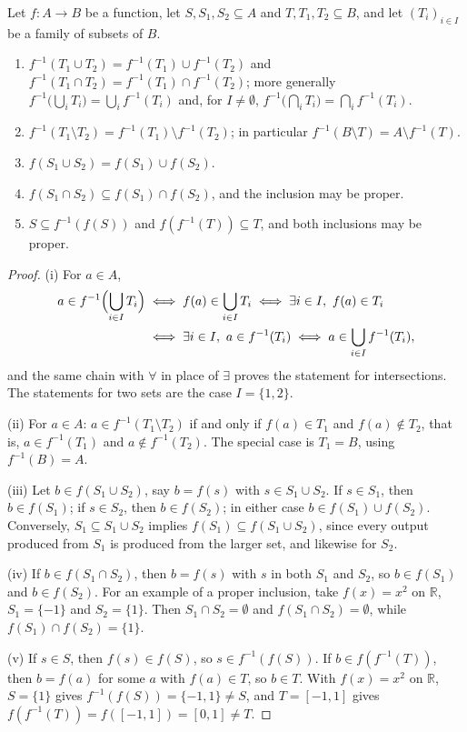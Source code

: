 \begin{proposition}
\label{prop:image-preimage}
Let $f\colon A\to B$ be a function, let $S,S_1,S_2\subseteq A$ and $T,T_1,T_2\subseteq B$, and let $(T_i)_{i\in I}$ be a family of subsets of $B$.
\begin{enumerate}
\item $f^{-1}(T_1\cup T_2)=f^{-1}(T_1)\cup f^{-1}(T_2)$ and $f^{-1}(T_1\cap T_2)=f^{-1}(T_1)\cap f^{-1}(T_2)$; more generally $f^{-1}\bigl(\bigcup_iT_i\bigr)=\bigcup_if^{-1}(T_i)$ and, for $I\ne\emptyset$, $f^{-1}\bigl(\bigcap_iT_i\bigr)=\bigcap_if^{-1}(T_i)$.
\item $f^{-1}(T_1\setminus T_2)=f^{-1}(T_1)\setminus f^{-1}(T_2)$; in particular $f^{-1}(B\setminus T)=A\setminus f^{-1}(T)$.
\item $f(S_1\cup S_2)=f(S_1)\cup f(S_2)$.
\item $f(S_1\cap S_2)\subseteq f(S_1)\cap f(S_2)$, and the inclusion may be proper.
\item $S\subseteq f^{-1}(f(S))$ and $f(f^{-1}(T))\subseteq T$, and both inclusions may be proper.
\end{enumerate}
\end{proposition}

\begin{proof}
(i) For $a\in A$,
\begin{align*}
a\in f^{-1}\Bigl(\bigcup_{i\in I}T_i\Bigr)&\iff f(a)\in\bigcup_{i\in I}T_i\iff\exists i\in I,\ f(a)\in T_i\\
&\iff\exists i\in I,\ a\in f^{-1}(T_i)\iff a\in\bigcup_{i\in I}f^{-1}(T_i),
\end{align*}
and the same chain with $\forall$ in place of $\exists$ proves the statement for intersections. The statements for two sets are the case $I=\{1,2\}$.

(ii) For $a\in A$: $a\in f^{-1}(T_1\setminus T_2)$ if and only if $f(a)\in T_1$ and $f(a)\notin T_2$, that is, $a\in f^{-1}(T_1)$ and $a\notin f^{-1}(T_2)$. The special case is $T_1=B$, using $f^{-1}(B)=A$.

(iii) Let $b\in f(S_1\cup S_2)$, say $b=f(s)$ with $s\in S_1\cup S_2$. If $s\in S_1$, then $b\in f(S_1)$; if $s\in S_2$, then $b\in f(S_2)$; in either case $b\in f(S_1)\cup f(S_2)$. Conversely, $S_1\subseteq S_1\cup S_2$ implies $f(S_1)\subseteq f(S_1\cup S_2)$, since every output produced from $S_1$ is produced from the larger set, and likewise for $S_2$.

(iv) If $b\in f(S_1\cap S_2)$, then $b=f(s)$ with $s$ in both $S_1$ and $S_2$, so $b\in f(S_1)$ and $b\in f(S_2)$. For an example of a proper inclusion, take $f(x)=x^2$ on $\mathbb R$, $S_1=\{-1\}$ and $S_2=\{1\}$. Then $S_1\cap S_2=\emptyset$ and $f(S_1\cap S_2)=\emptyset$, while $f(S_1)\cap f(S_2)=\{1\}$.

(v) If $s\in S$, then $f(s)\in f(S)$, so $s\in f^{-1}(f(S))$. If $b\in f(f^{-1}(T))$, then $b=f(a)$ for some $a$ with $f(a)\in T$, so $b\in T$. With $f(x)=x^2$ on $\mathbb R$, $S=\{1\}$ gives $f^{-1}(f(S))=\{-1,1\}\ne S$, and $T=[-1,1]$ gives $f(f^{-1}(T))=f([-1,1])=[0,1]\ne T$.
\end{proof}

